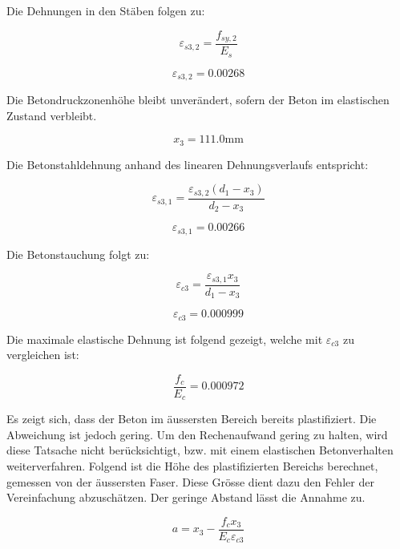 \documentclass[
  12pt,
  letterpaper,
  egregdoesnotlikesansseriftitles]{scrreprt}
\begin{document}
Die Dehnungen in den Stäben folgen zu:

\begin{equation}\varepsilon_{s3,2} = \frac{f_{sy,2}}{E_{s}}\end{equation}

\begin{equation}\varepsilon_{s3,2} = 0.00268\end{equation}

Die Betondruckzonenhöhe bleibt unverändert, sofern der Beton im
elastischen Zustand verbleibt.

\begin{equation}x_{3} = 111.0 \text{mm}\end{equation}

Die Betonstahldehnung anhand des linearen Dehnungsverlaufs entspricht:

\begin{equation}\varepsilon_{s3,1} = \frac{\varepsilon_{s3,2} \left(d_{1} - x_{3}\right)}{d_{2} - x_{3}}\end{equation}

\begin{equation}\varepsilon_{s3,1} = 0.00266\end{equation}

Die Betonstauchung folgt zu:

\begin{equation}\varepsilon_{c3} = \frac{\varepsilon_{s3,1} x_{3}}{d_{1} - x_{3}}\end{equation}

\begin{equation}\varepsilon_{c3} = 0.000999\end{equation}

Die maximale elastische Dehnung ist folgend gezeigt, welche mit
\(\varepsilon_{c3}\) zu vergleichen ist:

\begin{equation}\frac{f_{c}}{E_{c}} = 0.000972\end{equation}

Es zeigt sich, dass der Beton im äussersten Bereich bereits
plastifiziert. Die Abweichung ist jedoch gering. Um den Rechenaufwand
gering zu halten, wird diese Tatsache nicht berücksichtigt, bzw. mit
einem elastischen Betonverhalten weiterverfahren. Folgend ist die Höhe
des plastifizierten Bereichs berechnet, gemessen von der äussersten
Faser. Diese Grösse dient dazu den Fehler der Vereinfachung
abzuschätzen. Der geringe Abstand lässt die Annahme zu.

\begin{equation}a = x_{3} - \frac{f_{c} x_{3}}{E_{c} \varepsilon_{c3}}\end{equation}
\end{document}
